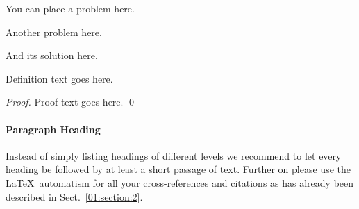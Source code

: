 \begin{bibunit}
	
	\begin{problem}
		You can place a problem here.
	\end{problem}
	
	\begin{problem}{\nocaption}
		Another problem here.
	\end{problem}
	
	\begin{solution}
		And its solution here.
	\end{solution}
	
	\begin{definition}
		Definition text goes here.
	\end{definition}
	
	\begin{proof}
		Proof text goes here. \qed
	\end{proof}
	
	
	\paragraph{Paragraph Heading} %
	Instead of simply listing headings of different levels we recommend to let every heading be followed by at least a short passage of text.  Further on please use the \LaTeX\ automatism for all your cross-references and citations as has already been described in Sect.~\ref{01:section:2}.
	

\end{bibunit}
